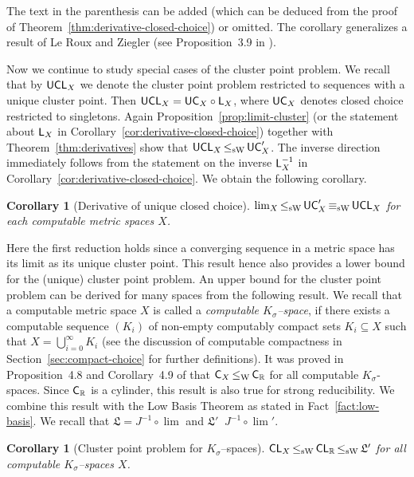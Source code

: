 \documentclass[a4paper]{amsart}
\def\IR{{\mathbb{R}}}
\def\Low{\mathfrak{L}}
\def\In{\subseteq}
\def\C{\mbox{\rm\sffamily C}}
\def\UC{\mbox{\rm\sffamily UC}}
\def\L{\text{\rm\sffamily L}}
\def\CL{\text{\rm\sffamily CL}}
\def\UCL{\text{\rm\sffamily UCL}}
\def\leqW{\mathop{\leq_{\mathrm{W}}}}
\def\leqSW{\mathop{\leq_{\mathrm{sW}}}}
\def\equivSW{\mathop{\equiv_{\mathrm{sW}}}}
\newtheorem{corollary}[theorem]{Corollary}
\theoremstyle{definition}
\begin{document}
The text in the parenthesis can be added (which can be deduced from the proof of Theorem~\ref{thm:derivative-closed-choice})
or omitted. The corollary generalizes a result of Le Roux and Ziegler (see Proposition~3.9 in \cite{LZ08a}).

Now we continue to study special cases of the cluster point problem.
We recall that by $\UCL_X$ we denote the cluster point problem restricted to sequences with a unique
cluster point. Then $\UCL_X=\UC_X\circ\L_X$, where $\UC_X$ denotes closed choice
restricted to singletons. 
Again Proposition~\ref{prop:limit-cluster} (or the statement about $\L_X$ in Corollary~\ref{cor:derivative-closed-choice})
together with Theorem~\ref{thm:derivatives} show that $\UCL_X\leqSW\UC_X'$. 
The inverse direction immediately follows from the statement on the inverse $\L_X^{-1}$
in Corollary~\ref{cor:derivative-closed-choice}. 
We obtain the following corollary.

\begin{corollary}[Derivative of unique closed choice]
\label{cor:derivative-unique-closed-choice}
$\lim_X\leqSW\UC_X'\equivSW\UCL_X$ for each computable metric spaces $X$.
\end{corollary}

Here the first reduction holds since a converging sequence in a metric space has its limit 
as its unique cluster point. This result hence also provides a lower bound for the 
(unique) cluster point problem. An upper bound for the cluster point problem can be
derived for many spaces from the following result. 
We recall that a computable metric space $X$ is called a {\em computable $K_\sigma$--space},
if there exists a computable sequence $(K_i)$ of non-empty computably compact sets $K_i\In X$
such that $X=\bigcup_{i=0}^\infty K_i$ (see the discussion of computable compactness in Section~\ref{sec:compact-choice}
for further definitions).
It was proved in Proposition~4.8
and Corollary~4.9 of \cite{BBP} that $\C_X\leqW\C_\IR$ for all computable $K_\sigma$-spaces.
Since $\C_\IR$ is a cylinder, this result is also true for strong reducibility.
We combine this result with the Low Basis Theorem as stated in Fact~\ref{fact:low-basis}.
We recall that $\Low=J^{-1}\circ\lim$ and $\Low'\equivSW J^{-1}\circ\lim'$.

\begin{corollary}[Cluster point problem for $K_\sigma$--spaces]
\label{cor:cluster-low}
$\CL_X\leqSW\CL_\IR\leqSW\Low'$ for all computable $K_\sigma$--spaces $X$.
\end{corollary}
\end{document}
